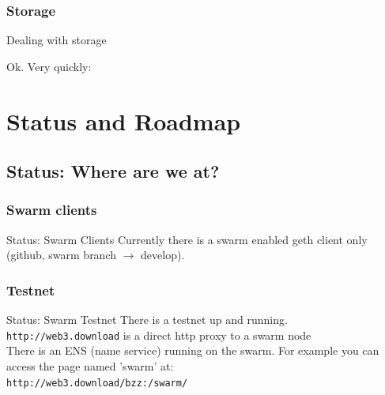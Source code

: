 \documentclass{beamer}
\begin{document}
\wholeslide{ }

\subsubsection{Storage}
\begin{frame}{Dealing with storage}
\begin{center}
\end{center}
\end{frame}

\begin{frame}
 Ok. Very quickly:\\
\end{frame}


\section[Status and Roadmap]{Status and Roadmap}
\subsection[Status]{Status: Where are we at?}
\subsubsection{Swarm clients}
\begin{frame}{Status: Swarm Clients}
Currently there is a swarm enabled geth client only (github, swarm branch $\rightarrow$ develop).\\
\end{frame}

\subsubsection{Testnet}
\begin{frame}{Status: Swarm Testnet}
There is a testnet up and running.\\
\texttt{http://web3.download} is a direct http proxy to a swarm node\\
There is an ENS (name service) running on the swarm. For example you can access the page named 'swarm' at:\\
	      \texttt{http://web3.download/bzz:/swarm/}
\end{frame}
\end{document}
